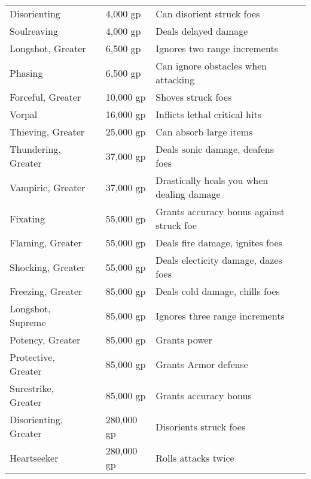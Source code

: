 \begin{longtabuwrapper}
\begin{longtabu}{l l l X l}
Disorienting &  & 4,000 gp & Can disorient struck foes & \pageref{item:Disorienting} \\
Soulreaving &  & 4,000 gp & Deals delayed damage & \pageref{item:Soulreaving} \\
Longshot, Greater &  & 6,500 gp & Ignores two range increments & \pageref{item:Longshot, Greater} \\
Phasing &  & 6,500 gp & Can ignore obstacles when attacking & \pageref{item:Phasing} \\
Forceful, Greater &  & 10,000 gp & Shoves struck foes & \pageref{item:Forceful, Greater} \\
Vorpal &  & 16,000 gp & Inflicts lethal critical hits & \pageref{item:Vorpal} \\
Thieving, Greater &  & 25,000 gp & Can absorb large items & \pageref{item:Thieving, Greater} \\
Thundering, Greater &  & 37,000 gp & Deals sonic damage, deafens foes & \pageref{item:Thundering, Greater} \\
Vampiric, Greater &  & 37,000 gp & Drastically heals you when dealing damage & \pageref{item:Vampiric, Greater} \\
Fixating &  & 55,000 gp & Grants accuracy bonus against struck foe & \pageref{item:Fixating} \\
Flaming, Greater &  & 55,000 gp & Deals fire damage, ignites foes & \pageref{item:Flaming, Greater} \\
Shocking, Greater &  & 55,000 gp & Deals electicity damage, dazes foes & \pageref{item:Shocking, Greater} \\
Freezing, Greater &  & 85,000 gp & Deals cold damage, chills foes & \pageref{item:Freezing, Greater} \\
Longshot, Supreme &  & 85,000 gp & Ignores three range increments & \pageref{item:Longshot, Supreme} \\
Potency, Greater &  & 85,000 gp & Grants  power & \pageref{item:Potency, Greater} \\
Protective, Greater &  & 85,000 gp & Grants  Armor defense & \pageref{item:Protective, Greater} \\
Surestrike, Greater &  & 85,000 gp & Grants  accuracy bonus & \pageref{item:Surestrike, Greater} \\
Disorienting, Greater &  & 280,000 gp & Disorients struck foes & \pageref{item:Disorienting, Greater} \\
Heartseeker &  & 280,000 gp & Rolls attacks twice & \pageref{item:Heartseeker} \\
\end{longtabu}
\end{longtabuwrapper}
